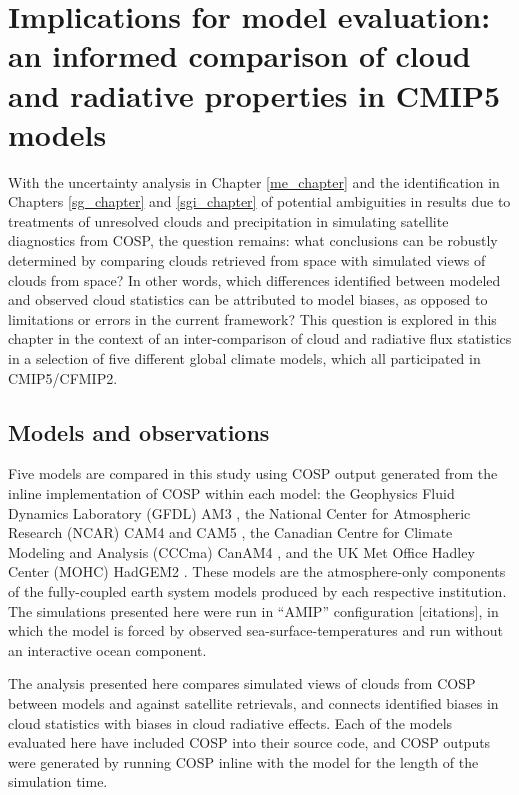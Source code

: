 \chapter{Implications for model evaluation: an informed comparison of cloud and
radiative properties in CMIP5 models}\label{cmip5_chapter}
With the uncertainty analysis in Chapter \ref{me_chapter} and the identification in Chapters \ref{sg_chapter} and \ref{sgi_chapter} of potential ambiguities in results due to treatments of unresolved clouds and precipitation in simulating satellite diagnostics from COSP, the question remains: what conclusions can be robustly determined by comparing clouds retrieved from space with simulated views of clouds from space? In other words, which differences identified between modeled and observed cloud statistics can be attributed to model biases, as opposed to limitations or errors in the current framework? This question is explored in this chapter in the context of an inter-comparison of cloud and radiative flux statistics in a selection of five different global climate models, which all participated in CMIP5/CFMIP2.

\section{Models and observations}
Five models are compared in this study using COSP output generated from the inline implementation of COSP within each model: the Geophysics Fluid Dynamics Laboratory (GFDL) AM3 \citep{donner_et_al_2011}, the National Center for Atmospheric Research (NCAR) CAM4 \citep{neale_et_al_2010a} and CAM5 \citep{neale_et_al_2010b}, the Canadian Centre for Climate Modeling and Analysis (CCCma) CanAM4 \citep{von_salzen_et_al_2012}, and the UK Met Office Hadley Center (MOHC) HadGEM2 \citep{martin_et_al_2011}. These models are the atmosphere-only components of the fully-coupled earth system models produced by each respective institution. The simulations presented here were run in ``AMIP'' configuration [citations], in which the model is forced by observed sea-surface-temperatures and run without an interactive ocean component.

The analysis presented here compares simulated views of clouds from COSP between models and against satellite retrievals, and connects identified biases in cloud statistics with biases in cloud radiative effects. Each of the models evaluated here have included COSP into their source code, and COSP outputs were generated by running COSP inline with the model for the length of the simulation time. 

